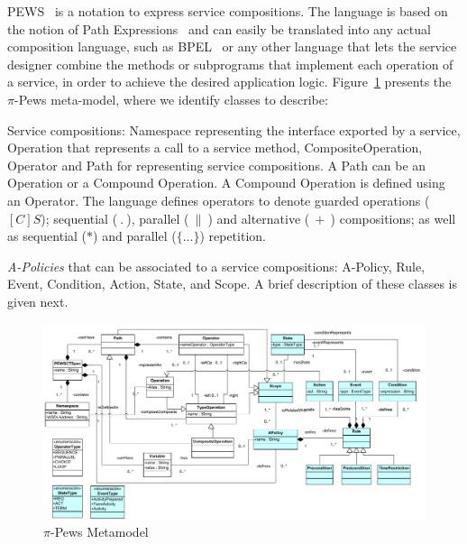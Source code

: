 PEWS~\cite{BHM06,Placido2010LTPD} is a notation to express service compositions.
The language is based on the notion of Path Expressions~\cite{And79} and can easily be translated into any actual composition language, such as BPEL~\cite{bpel03} or any other language that lets the service designer combine the methods or subprograms that implement each operation of a service, in order to achieve the desired application logic. 
Figure~\ref{fig:metamodel} presents the $\pi$-{\sc Pews} meta-model, where we identify classes to describe:
\begin{itemizedTrivlist}
\item Service compositions: {\sc Namespace} representing the interface exported by a service, {\sc Operation} that represents a call to a service method, {\sc CompositeOperation}, {\sc Operator} and {\sc Path} for representing service compositions.
A {\sc Path} can be an {\sc Operation} or a {\sc Compound Operation}. 
A {\sc Compound Operation} is defined using an {\sc Operator}.
The language defines operators to denote guarded operations ($[C]S$); sequential ($\ . \ $), parallel ($\ \| \ $) and alternative ($\ + \ $) compositions; as well as sequential ($*$) and parallel ($\{\dots\}$) repetition.

\item {\em A-Policies} that can be associated to a service compositions:  {\sc A-Policy}, {\sc Rule}, {\sc Event}, {\sc Condition}, {\sc Action}, {\sc State}, and {\sc Scope}.
A brief description of these classes is given next.
\end{itemizedTrivlist}
%
\begin{figure}[t]
\centering
\includegraphics[width=1.0\textwidth]{figs/PEWSMetamodel}
\caption{$\pi$-{\sc Pews} Metamodel}
\label{fig:metamodel}
\end{figure}


